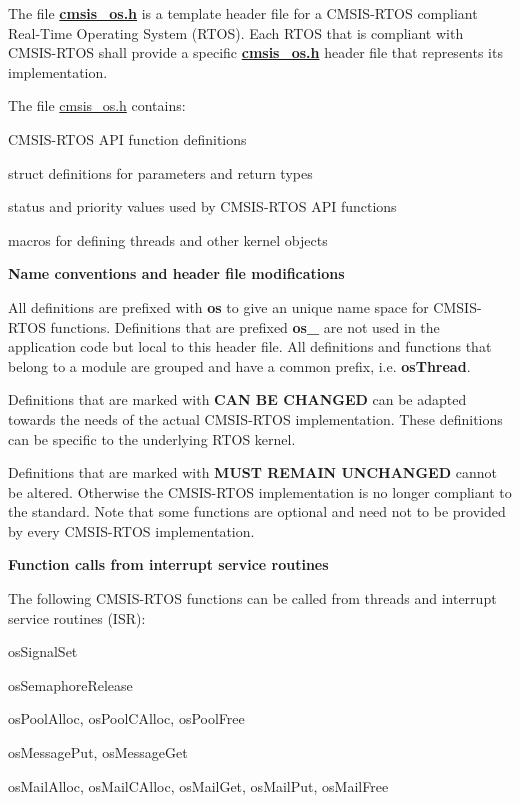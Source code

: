 The file {\bfseries{\mbox{\hyperlink{cmsis__os_8h_source}{cmsis\+\_\+os.\+h}}}} is a template header file for a CMSIS-\/\+RTOS compliant Real-\/\+Time Operating System (RTOS). Each RTOS that is compliant with CMSIS-\/\+RTOS shall provide a specific {\bfseries{\mbox{\hyperlink{cmsis__os_8h_source}{cmsis\+\_\+os.\+h}}}} header file that represents its implementation.

The file \mbox{\hyperlink{cmsis__os_8h_source}{cmsis\+\_\+os.\+h}} contains\+:
\begin{DoxyItemize}
\item CMSIS-\/\+RTOS API function definitions
\item struct definitions for parameters and return types
\item status and priority values used by CMSIS-\/\+RTOS API functions
\item macros for defining threads and other kernel objects
\end{DoxyItemize}

{\bfseries{Name conventions and header file modifications}}

All definitions are prefixed with {\bfseries{os}} to give an unique name space for CMSIS-\/\+RTOS functions. Definitions that are prefixed {\bfseries{os\+\_\+}} are not used in the application code but local to this header file. All definitions and functions that belong to a module are grouped and have a common prefix, i.\+e. {\bfseries{os\+Thread}}.

Definitions that are marked with {\bfseries{CAN BE CHANGED}} can be adapted towards the needs of the actual CMSIS-\/\+RTOS implementation. These definitions can be specific to the underlying RTOS kernel.

Definitions that are marked with {\bfseries{MUST REMAIN UNCHANGED}} cannot be altered. Otherwise the CMSIS-\/\+RTOS implementation is no longer compliant to the standard. Note that some functions are optional and need not to be provided by every CMSIS-\/\+RTOS implementation.

{\bfseries{Function calls from interrupt service routines}}

The following CMSIS-\/\+RTOS functions can be called from threads and interrupt service routines (ISR)\+:
\begin{DoxyItemize}
\item os\+Signal\+Set
\item os\+Semaphore\+Release
\item os\+Pool\+Alloc, os\+Pool\+CAlloc, os\+Pool\+Free
\item os\+Message\+Put, os\+Message\+Get
\item os\+Mail\+Alloc, os\+Mail\+CAlloc, os\+Mail\+Get, os\+Mail\+Put, os\+Mail\+Free
\end{DoxyItemize}

